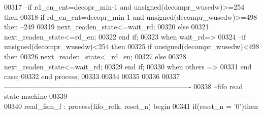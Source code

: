 \begin{DoxyCode}
00317 \textcolor{keyword}{        --if rd\_en\_cnt=decopr\_min-1 and unsigned(decompr\_wusedw)>=254 then}
00318         \textcolor{keywordflow}{if} \textcolor{vhdlchar}{rd_en_cnt}\textcolor{vhdlchar}{=}\textcolor{vhdlchar}{decopr_min}\textcolor{vhdlchar}{-}\textcolor{vhdllogic}{}\textcolor{vhdllogic}{1} \textcolor{keywordflow}{and} \textcolor{comment}{unsigned}\textcolor{vhdlchar}{(}\textcolor{vhdlchar}{decompr_wusedw}\textcolor{vhdlchar}{)}\textcolor{vhdlchar}{>=}\textcolor{vhdllogic}{}\textcolor{vhdllogic}{498} \textcolor{keywordflow}{then}\textcolor{keyword}{ --249 }
00319             \textcolor{vhdlchar}{next_readen_state}\textcolor{vhdlchar}{<=}\textcolor{vhdlchar}{wait\_rd};
00320         \textcolor{keywordflow}{else}
00321             \textcolor{vhdlchar}{next_readen_state}\textcolor{vhdlchar}{<=}\textcolor{vhdlchar}{rd\_en}; 
00322         \textcolor{keywordflow}{end} \textcolor{keywordflow}{if};
00323       \textcolor{keywordflow}{when} \textcolor{vhdlchar}{wait\_rd}\textcolor{vhdlchar}{=}\textcolor{vhdlchar}{>}
00324 \textcolor{keyword}{                --if  unsigned(decompr\_wusedw)<254 then}
00325                 \textcolor{keywordflow}{if}  \textcolor{comment}{unsigned}\textcolor{vhdlchar}{(}\textcolor{vhdlchar}{decompr_wusedw}\textcolor{vhdlchar}{)}\textcolor{vhdlchar}{<}\textcolor{vhdllogic}{}\textcolor{vhdllogic}{498} \textcolor{keywordflow}{then}  
00326                     \textcolor{vhdlchar}{next_readen_state}\textcolor{vhdlchar}{<=}\textcolor{vhdlchar}{rd\_en};    
00327                 \textcolor{keywordflow}{else}
00328                     \textcolor{vhdlchar}{next_readen_state}\textcolor{vhdlchar}{<=}\textcolor{vhdlchar}{wait\_rd};
00329                 \textcolor{keywordflow}{end} \textcolor{keywordflow}{if};  
00330       \textcolor{keywordflow}{when} \textcolor{keywordflow}{others} \textcolor{vhdlchar}{=}\textcolor{vhdlchar}{>} 
00331       \textcolor{keywordflow}{end} \textcolor{keywordflow}{case};
00332 \textcolor{keywordflow}{end} \textcolor{keywordflow}{process}; 
00333 
00334 
00335 
00336 
00337 \textcolor{keyword}{-------------------------------------------------------------------------------}
00338 \textcolor{keyword}{--fifo read state machine}
00339 \textcolor{keyword}{-------------------------------------------------------------------------------}
00340 read\_fsm\_f : \textcolor{keywordflow}{process}(fifo_rclk, reset_n) \textcolor{keywordflow}{begin}
00341     \textcolor{keywordflow}{if}\textcolor{vhdlchar}{(}\textcolor{vhdlchar}{reset_n} \textcolor{vhdlchar}{=} \textcolor{vhdlchar}{'}\textcolor{vhdllogic}{}\textcolor{vhdllogic}{0}\textcolor{vhdlchar}{'}\textcolor{vhdlchar}{)}\textcolor{keywordflow}{then}

\end{DoxyCode}
